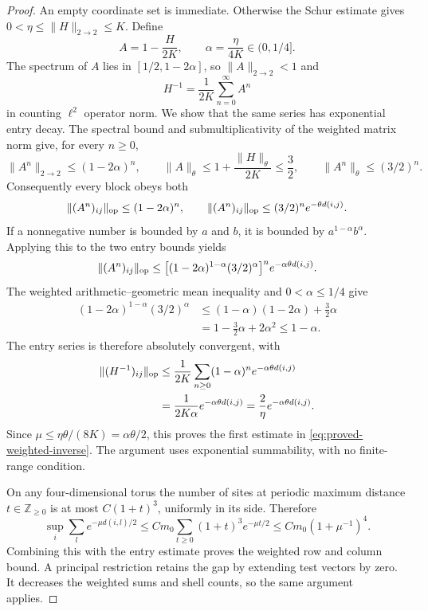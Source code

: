 \documentclass[11pt,reqno]{amsart}
\numberwithin{equation}{section}
\theoremstyle{definition}
\theoremstyle{remark}
\newcommand{\Z}{\mathbb Z}
\begin{document}
\begin{proof}
An empty coordinate set is immediate. Otherwise the Schur
estimate gives \(0<\eta\le\|H\|_{2\to2}\le K\). Define
\[
              A=1-\frac{H}{2K},\qquad
              \alpha=\frac{\eta}{4K}\in(0,1/4].
\]
The spectrum of \(A\) lies in \([1/2,1-2\alpha]\), so
\(\|A\|_{2\to2}<1\) and
\[
                H^{-1}=\frac1{2K}\sum_{n=0}^{\infty}A^n
\]
in counting \(\ell^2\) operator norm. We show that the same
series has exponential entry decay. The spectral bound
and submultiplicativity of the weighted matrix norm give,
for every \(n\ge0\),
\[
 \|A^n\|_{2\to2}\le(1-2\alpha)^n,\qquad
 \|A\|_\theta\le1+\frac{\|H\|_\theta}{2K}\le\frac32,
 \qquad \|A^n\|_\theta\le(3/2)^n.
\]
Consequently every block obeys both
\[
 \|(A^n)_{ij}\|_{\rm op}\le(1-2\alpha)^n,\qquad
 \|(A^n)_{ij}\|_{\rm op}\le(3/2)^n e^{-\theta d(i,j)}.
\]
If a nonnegative number is bounded by \(a\) and \(b\),
it is bounded by \(a^{1-\alpha}b^\alpha\). Applying this
to the two entry bounds yields
\[
 \|(A^n)_{ij}\|_{\rm op}
 \le\bigl[(1-2\alpha)^{1-\alpha}(3/2)^\alpha\bigr]^n
                                      e^{-\alpha\theta d(i,j)}.
\]
The weighted arithmetic--geometric mean inequality and
\(0<\alpha\le1/4\) give
\[
 \begin{split}
 (1-2\alpha)^{1-\alpha}(3/2)^\alpha
 &\le(1-\alpha)(1-2\alpha)+\tfrac32\alpha\\
 &=1-\tfrac32\alpha+2\alpha^2
 \le1-\alpha.
 \end{split}
\]
The entry series is therefore absolutely convergent, with
\[
 \begin{split}
 \|(H^{-1})_{ij}\|_{\rm op}
 &\le\frac1{2K}\sum_{n\ge0}(1-\alpha)^n
                                      e^{-\alpha\theta d(i,j)}\\
 &=\frac1{2K\alpha}e^{-\alpha\theta d(i,j)}
   =\frac2\eta e^{-\alpha\theta d(i,j)}.
 \end{split}
\]
Since \(\mu\le\eta\theta/(8K)=\alpha\theta/2\), this
proves the first estimate in
\eqref{eq:proved-weighted-inverse}. The argument uses
exponential summability, with no finite-range condition.

On any four-dimensional torus the number of sites at periodic
maximum distance \(t\in\Z_{\ge0}\) is at most
\(C(1+t)^3\), uniformly in its side. Therefore
\[
       \sup_i\sum_l e^{-\mu d(i,l)/2}
          \le C m_0\sum_{t\ge0}(1+t)^3e^{-\mu t/2}
          \le C m_0(1+\mu^{-1})^4.
\]
Combining this with the entry estimate proves the weighted
row and column bound. A principal restriction retains the
gap by extending test vectors by zero. It decreases the
weighted sums and shell counts, so the same argument applies.
\end{proof}
\end{document}
